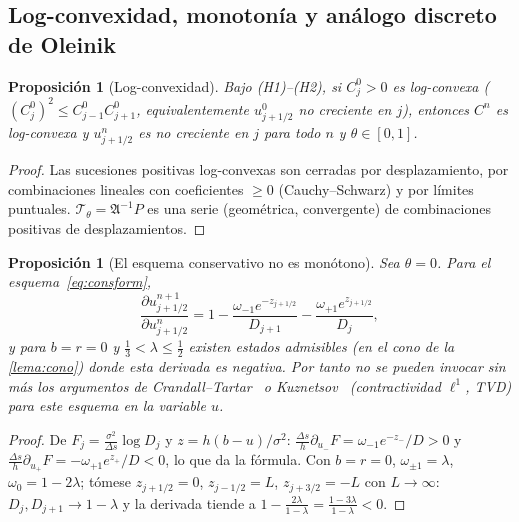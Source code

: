 \documentclass[11pt,letterpaper]{article}
\theoremstyle{plain}
\newtheorem{proposicion}[theorem]{Proposición}
\theoremstyle{definition}
\theoremstyle{remark}
\numberwithin{equation}{section}
\newcommand{\Top}{\mathcal{T}}
\begin{document}
	\subsection{Log-convexidad, monotonía y análogo discreto de Oleinik}\label{subsec:oleinik}
	
	\begin{proposicion}[Log-convexidad]\label{prop:logconv}
		Bajo (H1)--(H2), si \(C^0_j>0\) es log-convexa (\((C^0_j)^2\le C^0_{j-1}C^0_{j+1}\), equivalentemente \(u^0_{j+1/2}\) no creciente en \(j\)), entonces \(C^n\) es log-convexa y \(u^n_{j+1/2}\) es no creciente en \(j\) para todo \(n\) y \(\theta\in[0,1]\).
	\end{proposicion}
	
	\begin{proof}
		Las sucesiones positivas log-convexas son cerradas por desplazamiento, por combinaciones lineales con coeficientes \(\ge0\) (Cauchy--Schwarz) y por límites puntuales. \(\Top_\theta=\mathfrak A^{-1}P\) es una serie (geométrica, convergente) de combinaciones positivas de desplazamientos.
	\end{proof}
	
	\begin{proposicion}[El esquema conservativo no es monótono]\label{prop:nomono}
		Sea \(\theta=0\). Para el esquema~\eqref{eq:consform},
		\[
		\frac{\partial u^{n+1}_{j+1/2}}{\partial u^n_{j+1/2}}=1-\frac{\omega_{-1}e^{-z_{j+1/2}}}{D_{j+1}}-\frac{\omega_{+1}e^{z_{j+1/2}}}{D_j},
		\]
		y para \(b=r=0\) y \(\frac13<\lambda\le\frac12\) existen estados admisibles (en el cono de la \cref{lema:cono}) donde esta derivada es negativa. Por tanto no se pueden invocar sin más los argumentos de Crandall--Tartar~\cite{CrandallTartar1980} o Kuznetsov~\cite{Kuznetsov1976} (contractividad \(\ell^1\), TVD) para este esquema en la variable \(u\).
	\end{proposicion}
	
	\begin{proof}
		De \(F_j=\frac{\sigma^2}{\Delta s}\log D_j\) y \(z=h(b-u)/\sigma^2\): \(\frac{\Delta s}{h}\partial_{u_-}F=\omega_{-1}e^{-z_-}/D>0\) y \(\frac{\Delta s}{h}\partial_{u_+}F=-\omega_{+1}e^{z_+}/D<0\), lo que da la fórmula. Con \(b=r=0\), \(\omega_{\pm1}=\lambda\), \(\omega_0=1-2\lambda\); tómese \(z_{j+1/2}=0\), \(z_{j-1/2}=L\), \(z_{j+3/2}=-L\) con \(L\to\infty\): \(D_j,D_{j+1}\to1-\lambda\) y la derivada tiende a \(1-\frac{2\lambda}{1-\lambda}=\frac{1-3\lambda}{1-\lambda}<0\).
	\end{proof}
	
\end{document}
